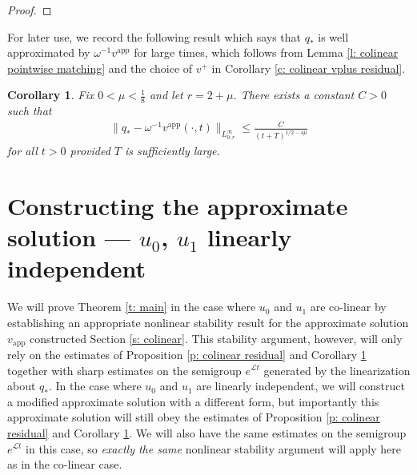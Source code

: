 \documentclass[11pt]{article}
\newcommand{\mcl}{\mathcal{L}}
\newtheorem{corollary}[prop]{Corollary}
\numberwithin{equation}{section}
\numberwithin{prop}{section}
\newcommand{\vapp}{v^\mathrm{app}}
\newcommand{\Fres}{F_\mathrm{res}}
\begin{document}
\begin{proof}
%	
%	
\end{proof}

For later use, we record the following result which says that $q_*$ is well approximated by $\omega^{-1} \vapp$ for large times, which follows from Lemma \ref{l: colinear pointwise matching} and the choice of $v^+$ in Corollary \ref{c: colinear vplus residual}. 
\begin{corollary}\label{c: colinear front approximated by vapp}
	Fix $0 < \mu < \frac{1}{8}$ and let $r = 2 + \mu$. There exists a constant $C>0$ such that
	\begin{align}
	\| q_* - \omega^{-1} \vapp(\cdot, t) \|_{L^\infty_{0, r}} \leq \frac{C}{(t+T)^{1/2-4\mu}}
	\end{align}
	for all $t>0$ provided $T$ is sufficiently large. 
\end{corollary}

\section{Constructing the approximate solution --- $u_0$, $u_1$ linearly independent}\label{s: linearly independent}

We will prove Theorem \ref{t: main} in the case where $u_0$ and $u_1$ are co-linear by establishing an appropriate nonlinear stability result for the approximate solution $v_\mathrm{app}$ constructed Section \ref{s: colinear}. This stability argument, however, will only rely on the estimates of Proposition \ref{p: colinear residual} and Corollary \ref{c: colinear front approximated by vapp} together with sharp estimates on the semigroup $e^{\mcl t}$ generated by the linearization about $q_*$. In the case where $u_0$ and $u_1$ are linearly independent, we will construct a modified approximate solution with a different form, but importantly this approximate solution will still obey the estimates of Proposition \ref{p: colinear residual} and Corollary \ref{c: colinear front approximated by vapp}. We will also have the same estimates on the semigroup $e^{\mcl t}$ in this case, so \emph{exactly the same} nonlinear stability argument will apply here as in the co-linear case.
\end{document}
